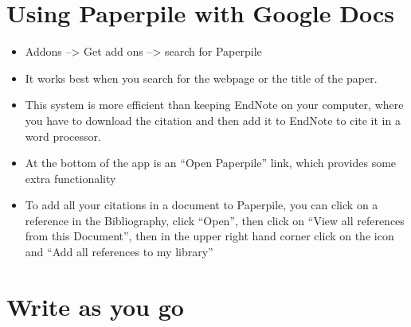 \documentclass[
  letterpaper,
  DIV=11,
  numbers=noendperiod]{scrreprt}
\begin{document}
\hypertarget{using-paperpile-with-google-docs}{%
\section*{\texorpdfstring{\textbf{Using Paperpile with Google
Docs}}{Using Paperpile with Google Docs}}\label{using-paperpile-with-google-docs}}

\begin{itemize}
\item
  Addons --\textgreater{} Get add ons --\textgreater{} search for
  Paperpile
\item
  It works best when you search for the webpage or the title of the
  paper.
\item
  This system is more efficient than keeping EndNote on your computer,
  where you have to download the citation and then add it to EndNote to
  cite it in a word processor.
\item
  At the bottom of the app is an ``Open Paperpile'' link, which provides
  some extra functionality
\item
  To add all your citations in a document to Paperpile, you can click on
  a reference in the Bibliography, click ``Open'', then click on ``View
  all references from this Document'', then in the upper right hand
  corner click on the icon and ``Add all references to my library''
\end{itemize}

\hypertarget{write-as-you-go}{%
\section*{\texorpdfstring{\textbf{Write as you
go}}{Write as you go}}\label{write-as-you-go}}
\end{document}
